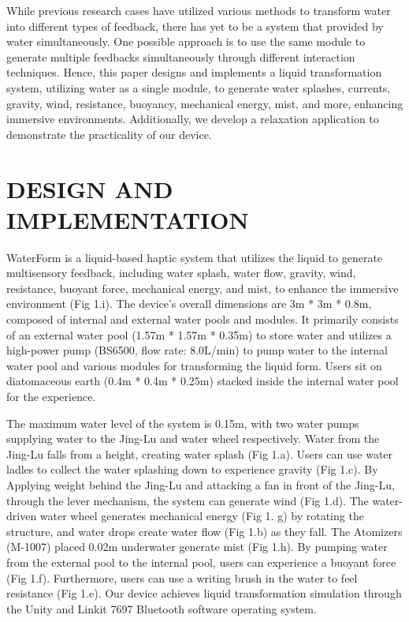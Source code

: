 \documentclass[manuscript]{acmart} %
\begin{document}
While previous research cases have utilized various methods to transform water into different types of feedback, there has yet to be a system that provided by water simultaneously. One possible approach is to use the same module to generate multiple feedbacks simultaneously through different interaction techniques. Hence, this paper designs and implements a liquid transformation system, utilizing water as a single module, to generate water splashes, currents, gravity, wind, resistance, buoyancy, mechanical energy, mist, and more, enhancing immersive environments. Additionally, we develop a relaxation application to demonstrate the practicality of our device.

\vspace{-0.5em}
\section{DESIGN AND IMPLEMENTATION}
WaterForm is a liquid-based haptic system that utilizes the liquid to generate multisensory feedback, including water splash, water flow, gravity, wind, resistance, buoyant force, mechanical energy, and mist, to enhance the immersive environment (Fig 1.i). The device's overall dimensions are 3m * 3m * 0.8m, composed of internal and external water pools and modules. It primarily consists of an external water pool (1.57m * 1.57m * 0.35m) to store water and utilizes a high-power pump (BS6500, flow rate: 8.0L/min) to pump water to the internal water pool and various modules for transforming the liquid form. Users sit on diatomaceous earth (0.4m * 0.4m * 0.25m) stacked inside the internal water pool for the experience.

The maximum water level of the system is 0.15m, with two water pumps supplying water to the Jing-Lu and water wheel respectively. Water from the Jing-Lu falls from a height, creating water splash (Fig 1.a). Users can use water ladles to collect the water splashing down to experience gravity (Fig 1.c). By Applying weight behind the Jing-Lu and attacking a fan in front of the Jing-Lu, through the lever mechanism, the system can generate wind (Fig 1.d). The water-driven water wheel generates mechanical energy (Fig 1. g) by rotating the structure, and water drops create water flow (Fig 1.b) as they fall. The Atomizers (M-1007) placed 0.02m underwater generate mist  (Fig 1.h). By pumping water from the external pool to the internal pool, users can experience a buoyant force (Fig 1.f). Furthermore, users can use a writing brush in the water to feel resistance (Fig 1.e). Our device achieves liquid transformation simulation through the Unity and Linkit 7697 Bluetooth software operating system.
\end{document}

